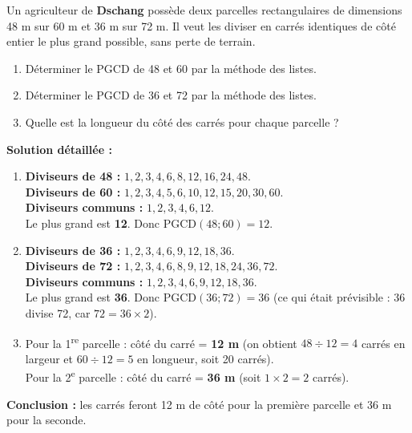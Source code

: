 \documentclass[11pt]{article}
\begin{document}
\begin{exoresolu}
Un agriculteur de \textbf{Dschang} possède deux parcelles rectangulaires de dimensions \num{48} m sur \num{60} m et \num{36} m sur \num{72} m. Il veut les diviser en carrés identiques de côté entier le plus grand possible, sans perte de terrain.
\begin{enumerate}
    \item Déterminer le PGCD de 48 et 60 par la méthode des listes.
    \item Déterminer le PGCD de 36 et 72 par la méthode des listes.
    \item Quelle est la longueur du côté des carrés pour chaque parcelle ?
\end{enumerate}
\tcblower
\textbf{Solution détaillée :}
\begin{enumerate}
    \item \textbf{Diviseurs de 48 :} $1, 2, 3, 4, 6, 8, 12, 16, 24, 48$.\\
    \textbf{Diviseurs de 60 :} $1, 2, 3, 4, 5, 6, 10, 12, 15, 20, 30, 60$.\\
    \textbf{Diviseurs communs :} $1, 2, 3, 4, 6, 12$.\\
    Le plus grand est \textbf{12}. Donc $\text{PGCD}(48; 60) = 12$.
    \item \textbf{Diviseurs de 36 :} $1, 2, 3, 4, 6, 9, 12, 18, 36$.\\
    \textbf{Diviseurs de 72 :} $1, 2, 3, 4, 6, 8, 9, 12, 18, 24, 36, 72$.\\
    \textbf{Diviseurs communs :} $1, 2, 3, 4, 6, 9, 12, 18, 36$.\\
    Le plus grand est \textbf{36}. Donc $\text{PGCD}(36; 72) = 36$ (ce qui était prévisible : 36 divise 72, car $72 = 36 \times 2$).
    \item Pour la 1\textsuperscript{re} parcelle : côté du carré = \textbf{12 m} (on obtient $48 \div 12 = 4$ carrés en largeur et $60 \div 12 = 5$ en longueur, soit 20 carrés).\\
    Pour la 2\textsuperscript{e} parcelle : côté du carré = \textbf{36 m} (soit $1 \times 2 = 2$ carrés).
\end{enumerate}
\textbf{Conclusion :} les carrés feront 12 m de côté pour la première parcelle et 36 m pour la seconde.
\end{exoresolu}
\end{document}
